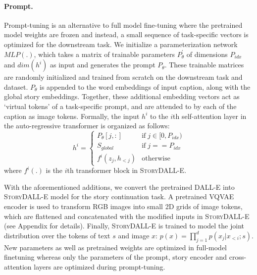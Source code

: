 \documentclass[runningheads]{llncs}
\newcommand{\sdalle}[1]{\textsc{StoryDALL-E}}
\begin{document}
\paragraph{Prompt.} Prompt-tuning is an alternative \cite{li2021prefix} to full model fine-tuning where the pretrained model weights are frozen and instead, a small sequence of task-specific vectors is optimized for the downstream task. We initialize a parameterization network $MLP(.)$, which takes a matrix of trainable parameters $P_\theta^{'}$ of dimensions $P_{idx}$ and $dim(h^i)$ as input and generates the prompt $P_\theta$. These trainable matrices are randomly initialized and trained from scratch on the downstream task and dataset. $P_\theta$ is appended to the word embeddings of input caption, along with the global story embeddings. Together, these additional embedding vectors act as `virtual tokens' of a task-specific prompt, and are attended to by each of the caption as image tokens. Formally, the input $h^{i}$ to the $i$th self-attention layer in the auto-regressive transformer is organized as follows:
\begin{equation}
    h^i = 
    \begin{cases}
    P_{\theta}[j, :] & \text{if}\; j\in [0, P_{idx})\\
    S_{global} & \text{if}\; j== P_{idx} \\
    f^{i}(z_j, h_{<j}) & \text{otherwise}
    \end{cases}
\end{equation}
where $f^{i}(.)$ is the $i$th transformer block in \sdalle{}.


With the aforementioned additions, we convert the pretrained DALL-E into \sdalle{} model for the story continuation task. A pretrained VQVAE encoder \cite{van2016conditional} is used to transform RGB images into small 2D grids of image tokens, which are flattened and concatenated with the modified inputs in \sdalle{} (see Appendix for details). Finally, \sdalle{} is trained to model the joint distribution over the tokens of text $s$ and image $x$: $p(x) = \prod_{j=1}^{d} p(x_{j}|x_{<i};s)$. New parameters as well as pretrained weights are optimized in full-model finetuning whereas only the parameters of the prompt, story encoder and cross-attention layers are optimized during prompt-tuning.
\end{document}
